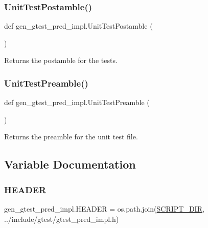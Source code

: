 \subsubsection{\texorpdfstring{Unit\+Test\+Postamble()}{UnitTestPostamble()}}
{\footnotesize\ttfamily def gen\+\_\+gtest\+\_\+pred\+\_\+impl.\+Unit\+Test\+Postamble (\begin{DoxyParamCaption}{ }\end{DoxyParamCaption})}

\begin{DoxyVerb}Returns the postamble for the tests.\end{DoxyVerb}
 \mbox{\label{namespacegen__gtest__pred__impl_ae52dc86461d1b666c7b658a8c27c69f9}} 
\subsubsection{\texorpdfstring{Unit\+Test\+Preamble()}{UnitTestPreamble()}}
{\footnotesize\ttfamily def gen\+\_\+gtest\+\_\+pred\+\_\+impl.\+Unit\+Test\+Preamble (\begin{DoxyParamCaption}{ }\end{DoxyParamCaption})}

\begin{DoxyVerb}Returns the preamble for the unit test file.\end{DoxyVerb}
 

\subsection{Variable Documentation}
\mbox{\label{namespacegen__gtest__pred__impl_ab96c63705e2cb7619876ba592dab4c8e}} 
\subsubsection{\texorpdfstring{H\+E\+A\+D\+ER}{HEADER}}
{\footnotesize\ttfamily gen\+\_\+gtest\+\_\+pred\+\_\+impl.\+H\+E\+A\+D\+ER = os.\+path.\+join(\hyperlink{namespacegen__gtest__pred__impl_aed087c7fc787a064f0a9fd5f5f9f6487}{S\+C\+R\+I\+P\+T\+\_\+\+D\+IR}, \textquotesingle{}../include/gtest/gtest\+\_\+pred\+\_\+impl.\+h\textquotesingle{})}

